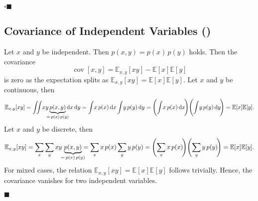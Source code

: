 \documentclass[11pt, a4paper]{scrartcl}
\newcommand{\E}{\mathbb{E}}
\DeclareMathOperator{\cov}{cov}
\newcommand{\eot}{\hfill\(\blacksquare\)}
\newcommand{\qedeot}{\hfill\(\square\blacksquare\)}
\newcommand{\diffstar}{\texorpdfstring{\raisebox{-1pt}{\resizebox{!}{8pt}{\(\star\)}}}{*}}
\newcommand{\onestar}  {(\diffstar)}
\begin{document}
			\qedeot

		\subsection{Covariance of Independent Variables  \onestar}
			\label{subsec:1-6}

			Let \(x\) and \(y\) be independent. Then \( p(x, y) = p(x) \, p(y) \) holds. Then the covariance
			\begin{equation}
				\cov[x, y] = \E_{x, y}[xy] - \E[x] \E[y]
			\end{equation}
			is zero as the expectation splits as \( \E_{x, y}[xy] = \E[x] \E[y] \). Let \(x\) and \(y\) be continuous, then
			\begin{equation}
				\E_{x, y}[xy]
					= \iint\! x y \underbrace{p(x, y)}_{\mathclap{=\, p(x) \, p(y)}} \dd{x} \dd{y}
					= \int\! x \, p(x) \dd{x} \int\! y \, p(y) \dd{y}
					= \Bigg(\! \int\! x \, p(x) \dd{x} \!\!\Bigg) \Bigg(\! \int\! y \, p(y) \dd{y} \!\!\Bigg)
					= \E[x] \E[y].
			\end{equation}
			Let \(x\) and \(y\) be discrete, then
			\begin{equation}
				\E_{x, y}[xy]
					= \sum_x \sum_y x y \, \underbrace{p(x, y)}_{\mathclap{=\, p(x) \, p(y)}}
					= \sum_x x \, p(x) \sum_y y \, p(y)
					= \Bigg(\! \sum_x x \, p(x) \!\Bigg) \Bigg(\! \sum_y y \, p(y) \!\Bigg)
					= \E[x] \E[y].
			\end{equation}
			For mixed cases, the relation \( \E_{x, y}[xy] = \E[x] \E[y] \) follows trivially. Hence, the covariance vanishes for two independent variables.

			\eot
\end{document}
